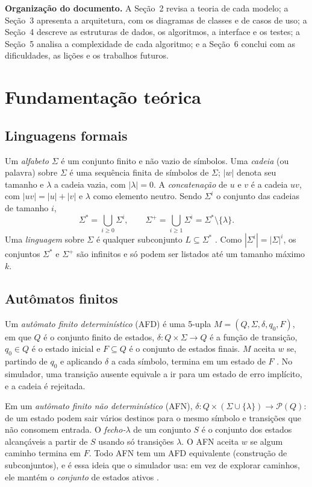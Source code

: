 \documentclass[12pt,a4paper]{article}
\newcommand{\lam}{\lambda}
\begin{document}
\noindent\textbf{Organização do documento.} A Seção~2 revisa a teoria de cada
modelo; a Seção~3 apresenta a arquitetura, com os diagramas de classes e de
casos de uso; a Seção~4 descreve as estruturas de dados, os algoritmos, a
interface e os testes; a Seção~5 analisa a complexidade de cada algoritmo; e a
Seção~6 conclui com as dificuldades, as lições e os trabalhos futuros.

\section{Fundamentação teórica}

\subsection{Linguagens formais}

Um \emph{alfabeto} $\Sigma$ é um conjunto finito e não vazio de símbolos.
Uma \emph{cadeia} (ou palavra) sobre $\Sigma$ é uma sequência finita de
símbolos de $\Sigma$; $|w|$ denota seu tamanho e $\lam$ a cadeia vazia, com
$|\lam| = 0$. A \emph{concatenação} de $u$ e $v$ é a cadeia $uv$, com
$|uv| = |u| + |v|$ e $\lam$ como elemento neutro. Sendo $\Sigma^i$ o conjunto
das cadeias de tamanho $i$,
\[
  \Sigma^* = \bigcup_{i \ge 0} \Sigma^i, \qquad
  \Sigma^+ = \bigcup_{i \ge 1} \Sigma^i = \Sigma^* \setminus \{\lam\}.
\]
Uma \emph{linguagem} sobre $\Sigma$ é qualquer subconjunto $L \subseteq \Sigma^*$
\cite{menezes,sipser}. Como $|\Sigma^i| = |\Sigma|^i$, os conjuntos $\Sigma^*$ e
$\Sigma^+$ são infinitos e só podem ser listados até um tamanho máximo $k$.

\subsection{Autômatos finitos}

Um \emph{autômato finito determinístico} (AFD) é uma 5-upla
$M = (Q, \Sigma, \delta, q_0, F)$, em que $Q$ é o conjunto finito de estados,
$\delta: Q \times \Sigma \to Q$ é a função de transição, $q_0 \in Q$ é o estado
inicial e $F \subseteq Q$ é o conjunto de estados finais. $M$ aceita $w$ se,
partindo de $q_0$ e aplicando $\delta$ a cada símbolo, termina em um estado de
$F$ \cite{sipser}. No simulador, uma transição ausente equivale a ir para um
estado de erro implícito, e a cadeia é rejeitada.

Em um \emph{autômato finito não determinístico} (AFN),
$\delta: Q \times (\Sigma \cup \{\lam\}) \to \mathcal{P}(Q)$: de um estado podem
sair vários destinos para o mesmo símbolo e transições que não consomem
entrada. O \emph{fecho-$\lam$} de um conjunto $S$ é o conjunto dos estados
alcançáveis a partir de $S$ usando só transições $\lam$. O AFN aceita $w$ se
algum caminho termina em $F$. Todo AFN tem um AFD equivalente (construção de
subconjuntos), e é essa ideia que o simulador usa: em vez de explorar
caminhos, ele mantém o \emph{conjunto} de estados ativos \cite{hopcroft}.
\end{document}
